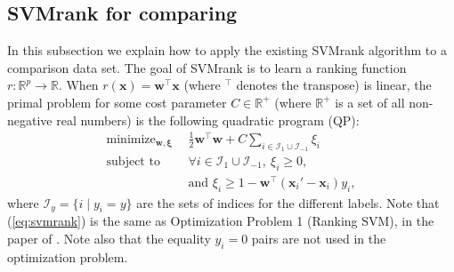 \documentclass[twoside,11pt]{article}
\newcommand{\RR}{\mathbb R}
\DeclareMathOperator*{\minimize}{minimize}
\begin{document}
\subsection{SVMrank for comparing}
\label{sec:svmrank}
In this subsection we explain how to apply the existing SVMrank algorithm
to a comparison data set.  The goal of SVMrank is to learn a ranking
function $r:\RR^p \rightarrow \RR$. When $r(\mathbf x)=\mathbf
w^\intercal \mathbf x$ (where $^\top$ denotes the transpose) is linear, the primal problem for some cost
parameter $C\in\RR^+$ (where $\mathbb{R}^+$ is a set of all non-negative real numbers) is the following quadratic program (QP):
\begin{equation}
  \begin{aligned}
    \minimize_{\mathbf w, \mathbf \xi}\ \ & \frac 1 2
    \mathbf w^\intercal \mathbf w
    + C \sum_{i\in \mathcal I_1\cup \mathcal I_{-1}} \xi_i \\
    \text{subject to}\ \ &
    \forall i\in \mathcal I_1\cup \mathcal I_{-1},\ \xi_i \geq 0,\\
    & \text{and }\xi_i \geq 1-\mathbf w^\intercal(\mathbf x_i'-\mathbf
    x_i)y_i,
  \end{aligned}
  \label{eq:svmrank}
\end{equation}
where $\mathcal I_y=\{i\mid y_i=y\}$ are the sets of indices for the different
labels. Note that (\ref{eq:svmrank}) is the same as Optimization
Problem 1 (Ranking SVM), in the paper of \citet{ranksvm}. Note also
that the equality $y_i=0$ pairs are not used in the optimization
problem.
\end{document}
